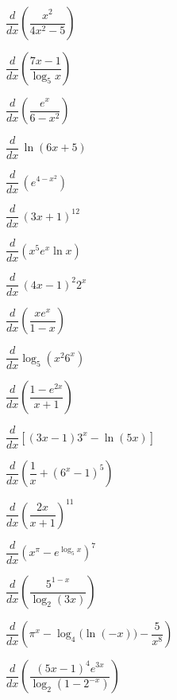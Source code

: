 \documentclass[11pt,letterpaper]{article}
\begin{document}
\prob
	\begin{2enumerate}
	\item $\dfrac{d}{dx} \left( \dfrac{x^2}{4x^2 - 5} \right)$
	\item $\dfrac{d}{dx} \left( \dfrac{7x - 1}{\log_5 x} \right)$
	\item $\dfrac{d}{dx} \left(\dfrac{e^x}{6 - x^2} \right)$
	\item $\dfrac{d}{dx}\, \ln(6x + 5)$
	\item $\dfrac{d}{dx}\, \left(e^{4 - x^2} \right)$
	\item $\dfrac{d}{dx}\, (3x + 1)^{12}$
	\end{2enumerate}



\vfill 


\prob
	\begin{2enumerate}
	\item $\dfrac{d}{dx} (x^5 e^x \ln x)$
	\item $\dfrac{d}{dx}\, (4x - 1)^2 2^x$
	\item $\dfrac{d}{dx} \left( \dfrac{xe^x}{1 - x} \right)$
	\item $\dfrac{d}{dx} \log_5(x^2 6^x)$
	\item $\dfrac{d}{dx} \left( \dfrac{1 - e^{2x}}{x + 1} \right)$
	\item $\dfrac{d}{dx} \left[ (3x - 1) 3^x - \ln(5x) \right]$
	\end{2enumerate}


\vfill 


\prob
	\begin{2enumerate}
	\item $\dfrac{d}{dx} \left( \dfrac{1}{x} + (6^x - 1)^5 \right)$
	\item $\dfrac{d}{dx} \left( \dfrac{2x}{x + 1} \right)^{11}$
	\item $\dfrac{d}{dx} \left(x^\pi - e^{\log_5 x} \right)^7$
	\item $\dfrac{d}{dx} \left( \dfrac{5^{1-x}}{\log_2(3x)} \right)$
	\item $\dfrac{d}{dx} \left( \pi^x - \log_4 \big(\ln(-x) \big) - \dfrac{5}{x^8} \right)$
	\item $\dfrac{d}{dx} \left( \dfrac{(5x - 1)^4 e^{3x}}{\log_2(1 - 2^{-x})} \right)$
	\end{2enumerate} \vfill



\newpage



\setcounter{problem}{0}
\end{document}
